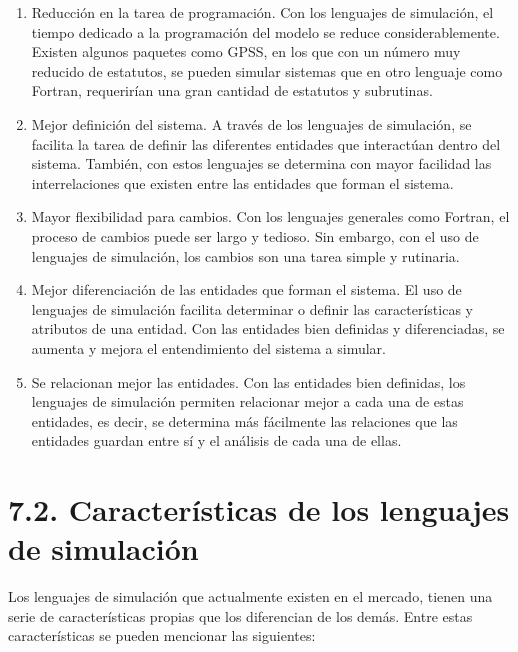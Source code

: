 \documentclass[11pt,letterpaper]{report}
\begin{document}
\begin{enumerate}[label=\alph*)]
\item Reducción en la tarea de programación. Con los lenguajes de
simulación, el tiempo dedicado a la programación del modelo se reduce
considerablemente. Existen algunos paquetes como GPSS, en los que con un
número muy reducido de estatutos, se pueden simular sistemas que en otro
lenguaje como Fortran, requerirían una gran cantidad de estatutos y
subrutinas.
\item Mejor definición del sistema. A través de los lenguajes de
simulación, se facilita la tarea de definir las diferentes entidades que
interactúan dentro del sistema. También, con estos lenguajes se
determina con mayor facilidad las interrelaciones que existen entre las
entidades que forman el sistema.
\item Mayor flexibilidad para cambios. Con los lenguajes generales como
Fortran, el proceso de cambios puede ser largo y tedioso. Sin embargo,
con el uso de lenguajes de simulación, los cambios son una tarea simple
y rutinaria.
\item Mejor diferenciación de las entidades que forman el sistema. El
uso de lenguajes de simulación facilita determinar o definir las
características y atributos de una entidad. Con las entidades bien
definidas y diferenciadas, se aumenta y mejora el entendimiento del
sistema a simular.
\item Se relacionan mejor las entidades. Con las entidades bien
definidas, los lenguajes de simulación permiten relacionar mejor a cada
una de estas entidades, es decir, se determina más fácilmente las
relaciones que las entidades guardan entre sí y el análisis de cada una
de ellas.
\end{enumerate}

\section*{7.2. Características de los lenguajes de simulación}

Los lenguajes de simulación que actualmente existen en el mercado,
tienen una serie de características propias que los diferencian de los
demás. Entre estas características se pueden mencionar las siguientes:
\end{document}
